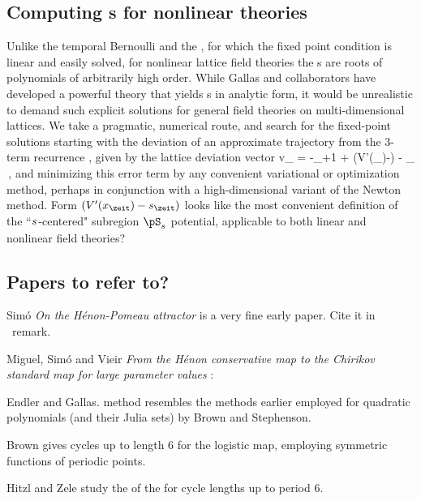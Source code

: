 \subsection{Computing {\lattstate}s for nonlinear theories}
\label{s:nonlinLattStates}

Unlike the {temporal Bernoulli}  and the
{\templatt} , for which the {\lattstate} fixed
point condition 
is linear and easily solved, for
nonlinear lattice field theories the {\lattstate}s are roots of
polynomials of arbitrarily high order. While Gallas and collaborators%
have developed a powerful theory that yields {\HenonMap} {\po}s in
analytic form, it would be unrealistic to demand such explicit solutions for
general field theories on multi-dimensional lattices. We take a
pragmatic, numerical route, and search for the fixed-point solutions
starting with the deviation of an approximate trajectory from the 3-term
recurrence , given by the lattice deviation vector
\beq
v_{\zeit} = -\ssp_{\zeit+1} + (V'(\ssp_{\zeit})-\Ssym{\zeit}) - \ssp_{}
\,,
and minimizing this error term by any convenient variational or
optimization method, perhaps in conjunction with a high-dimensional
variant of the Newton method.
     {
Form $(V'(\ssp_{\zeit})-\Ssym{\zeit})$ looks like the most convenient
definition of the ``${s_{}}$-centered" subregion $\pS_\Ssym{}$ potential,
applicable to both linear and nonlinear field theories?
    }



\subsection{Papers to refer to?}

Sim{\'o} {\em On the {H{\'e}non-Pomeau} attractor}
is a very fine early paper. Cite it in \Henon\ remark.

Miguel, Sim{\'{o}} and Vieir {\em From the {H{\'{e}}non}
conservative map to the {Chirikov} standard map for large parameter
values} :

Endler and Gallas.
method resembles the methods
earlier employed for quadratic polynomials (and their Julia sets) by
Brown
and Stephenson.

Brown gives cycles up to length 6 for the logistic map,
employing symmetric functions of periodic points.

Hitzl and Zele
study the of the {\HenonMap} for cycle lengths  up to period  6.
